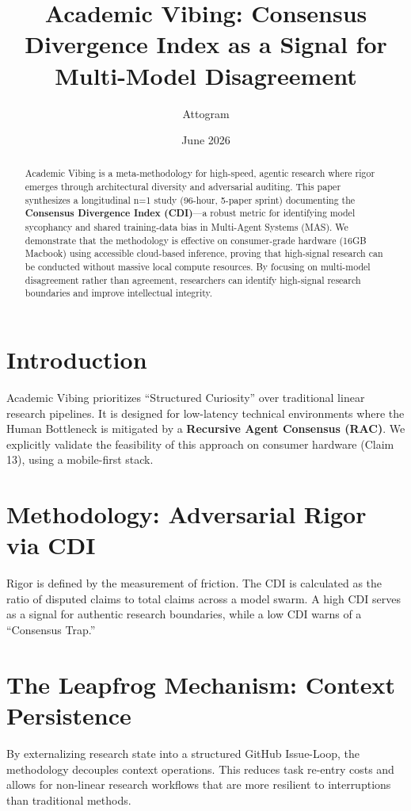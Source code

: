 \documentclass{article}
\title{Academic Vibing: Consensus Divergence Index as a Signal for Multi-Model Disagreement}
\author{Attogram}
\date{June 2026}
\begin{document}
\maketitle

\begin{abstract}
Academic Vibing is a meta-methodology for high-speed, agentic research where rigor emerges through architectural diversity and adversarial auditing. This paper synthesizes a longitudinal n=1 study (96-hour, 5-paper sprint) documenting the \textbf{Consensus Divergence Index (CDI)}—a robust metric for identifying model sycophancy and shared training-data bias in Multi-Agent Systems (MAS). We demonstrate that the methodology is effective on consumer-grade hardware (16GB Macbook) using accessible cloud-based inference, proving that high-signal research can be conducted without massive local compute resources. By focusing on multi-model disagreement rather than agreement, researchers can identify high-signal research boundaries and improve intellectual integrity.
\end{abstract}

\section{Introduction}
Academic Vibing prioritizes ``Structured Curiosity'' over traditional linear research pipelines. It is designed for low-latency technical environments where the Human Bottleneck is mitigated by a \textbf{Recursive Agent Consensus (RAC)}. We explicitly validate the feasibility of this approach on consumer hardware (Claim 13), using a mobile-first stack.

\section{Methodology: Adversarial Rigor via CDI}
Rigor is defined by the measurement of friction. The CDI is calculated as the ratio of disputed claims to total claims across a model swarm. A high CDI serves as a signal for authentic research boundaries, while a low CDI warns of a ``Consensus Trap.''

\section{The Leapfrog Mechanism: Context Persistence}
By externalizing research state into a structured GitHub Issue-Loop, the methodology decouples context operations. This reduces task re-entry costs and allows for non-linear research workflows that are more resilient to interruptions than traditional methods.
\end{document}
